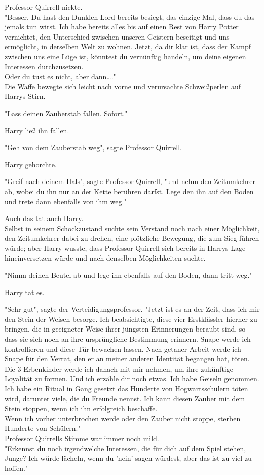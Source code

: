 {Professor Quirrell nickte.\\ "Besser. Du hast den Dunklen Lord bereits besiegt, das einzige Mal, dass du das jemals tun wirst. Ich habe bereits alles bis auf einen Rest von Harry Potter vernichtet, den Unterschied zwischen unseren Geistern beseitigt und uns ermöglicht, in derselben Welt zu wohnen. Jetzt, da dir klar ist, dass der Kampf zwischen uns eine Lüge ist, könntest du vernünftig handeln, um deine eigenen Interessen durchzusetzen.\\ Oder du tust es nicht, aber dann…."\\ Die Waffe bewegte sich leicht nach vorne und verursachte Schweißperlen auf Harrys Stirn.

"Lass deinen Zauberstab fallen. Sofort."

Harry ließ ihn fallen.

"Geh von dem Zauberstab weg", sagte Professor Quirrell.

Harry gehorchte.

"Greif nach deinem Hals", sagte Professor Quirrell, "und nehm den Zeitumkehrer ab, wobei du ihn nur an der Kette berühren darfst. Lege den ihn auf den Boden und trete dann ebenfalls von ihm weg."

Auch das tat auch Harry.\\ Selbst in seinem Schockzustand suchte sein Verstand noch nach einer Möglichkeit, den Zeitumkehrer dabei zu drehen, eine plötzliche Bewegung, die zum Sieg führen würde; aber Harry wusste, dass Professor Quirrell sich bereits in Harrys Lage hineinversetzen würde und nach denselben Möglichkeiten suchte.

"Nimm deinen Beutel ab und lege ihn ebenfalls auf den Boden, dann tritt weg."

Harry tat es.

"Sehr gut", sagte der Verteidigungsprofessor. "Jetzt ist es an der Zeit, dass ich mir den Stein der Weisen besorge. Ich beabsichtigte, diese vier Erstklässler hierher zu bringen, die in geeigneter Weise ihrer jüngsten Erinnerungen beraubt sind, so dass sie sich noch an ihre ursprüngliche Bestimmung erinnern. Snape werde ich kontrollieren und diese Tür bewachen lassen. Nach getaner Arbeit werde ich Snape für den Verrat, den er an meiner anderen Identität begangen hat, töten. Die 3 Erbenkinder werde ich danach mit mir nehmen, um ihre zukünftige Loyalität zu formen. Und ich erzähle dir noch etwas. Ich habe Geiseln genommen. Ich habe ein Ritual in Gang gesetzt das Hunderte von Hogwartsschülern töten wird, darunter viele, die du Freunde nennst. Ich kann diesen Zauber mit dem Stein stoppen, wenn ich ihn erfolgreich beschaffe.\\ Wenn ich vorher unterbrochen werde oder den Zauber nicht stoppe, sterben Hunderte von Schülern."\\ Professor Quirrells Stimme war immer noch mild.\\ "Erkennst du noch irgendwelche Interessen, die für dich auf dem Spiel stehen, Junge? Ich würde lächeln, wenn du 'nein' sagen würdest, aber das ist zu viel zu hoffen."

}
